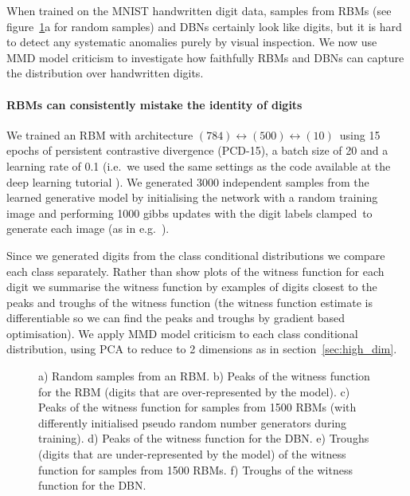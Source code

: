 \documentclass{article} %
\def\ie{i.e.\ }
\def\eg{e.g.\ }
\begin{document}
When trained on the MNIST handwritten digit data, samples from RBMs (see figure~\ref{fig:digits}a for random samples\footnotemark) and DBNs certainly look like digits, but it is hard to detect any systematic anomalies purely by visual inspection.
We now use MMD model criticism to investigate how faithfully RBMs and DBNs can capture the distribution over handwritten digits.

\paragraph{RBMs can consistently mistake the identity of digits}

We trained an RBM with architecture $(784)\leftrightarrow(500)\leftrightarrow(10)$\footnotemark~using 15 epochs of persistent contrastive divergence (PCD-15), a batch size of 20 and a learning rate of 0.1 (\ie we used the same settings as the code available at the deep learning tutorial \citep{noauthor_2014-kp}).
We generated 3000 independent samples from the learned generative model by initialising the network with a random training image and performing 1000 gibbs updates with the digit labels clamped\footnotemark~to generate each image (as in \eg \cite{Hinton2007-eo}).

Since we generated digits from the class conditional distributions we compare each class separately.
Rather than show plots of the witness function for each digit we summarise the witness function by examples of digits closest to the peaks and troughs of the witness function (the witness function estimate is differentiable so we can find the peaks and troughs by gradient based optimisation).
We apply MMD model criticism to each class conditional distribution, using PCA to reduce to 2 dimensions as in section~\ref{sec:high_dim}.

\begin{figure}[ht]
\centering

\caption{
a) Random samples from an RBM.
b) Peaks of the witness function for the RBM (digits that are over-represented by the model).
c) Peaks of the witness function for samples from 1500 RBMs (with differently initialised pseudo random number generators during training).
d) Peaks of the witness function for the DBN.
e) Troughs (digits that are under-represented by the model) of the witness function for samples from 1500 RBMs.
f) Troughs of the witness function for the DBN.
}
\label{fig:digits}
\end{figure}
\end{document}
